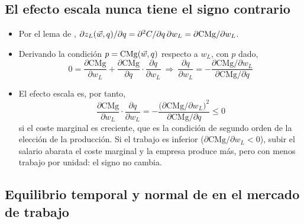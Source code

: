 \documentclass[11pt]{article}
\begin{document}
\subsection{El efecto escala nunca tiene el signo contrario}\label{anexo:efecto-escala}

\begin{itemize}
\item Por el lema de , $\partial z_L(\vec{w},q)/\partial q=\partial^2C/\partial q\,\partial w_L=\partial\mathrm{CMg}/\partial w_L$.
\item Derivando la condición $p=\mathrm{CMg}(\vec{w},q)$ respecto a $w_L$, con $p$ dado,
  \[
  0=\frac{\partial\mathrm{CMg}}{\partial w_L}+\frac{\partial\mathrm{CMg}}{\partial q}\cdot\frac{\partial q}{\partial w_L}\ \Longrightarrow\ \frac{\partial q}{\partial w_L}=-\frac{\partial\mathrm{CMg}/\partial w_L}{\partial\mathrm{CMg}/\partial q}
  \]
\item El efecto escala es, por tanto,
  \[
  \frac{\partial\mathrm{CMg}}{\partial w_L}\cdot\frac{\partial q}{\partial w_L}=-\frac{\big(\partial\mathrm{CMg}/\partial w_L\big)^2}{\partial\mathrm{CMg}/\partial q}\leq 0
  \]
  si el coste marginal es creciente, que es la condición de segundo orden de la elección de la producción. Si el trabajo es inferior ($\partial\mathrm{CMg}/\partial w_L<0$), subir el salario abarata el coste marginal y la empresa produce más, pero con menos trabajo por unidad: el signo no cambia.\findemo
\end{itemize}

\subsection{Equilibrio temporal y normal de  en el mercado de trabajo}\label{anexo:marshall-trabajo}
\end{document}
